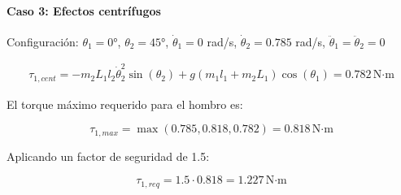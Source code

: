 \paragraph{Caso 3: Efectos centrífugos}

Configuración: $\theta_1 = 0°$, $\theta_2 = 45°$, $\dot{\theta}_1 = 0$ rad/s, $\dot{\theta}_2 = 0.785$ rad/s, $\ddot{\theta}_1 = \ddot{\theta}_2 = 0$

\begin{multline}
\tau_{1,cent} = - m_2L_1l_2\dot{\theta}_2^2\sin(\theta_2) + g(m_1l_1 + m_2L_1)\cos(\theta_1) = 0.782 \, \text{N·m}
\end{multline}

El torque máximo requerido para el hombro es:

\begin{equation}
\tau_{1,max} = \max(0.785, 0.818, 0.782) = 0.818 \, \text{N·m} 
\end{equation}

Aplicando un factor de seguridad de 1.5:

\begin{equation}
\tau_{1,req} = 1.5 \cdot 0.818 = 1.227 \, \text{N·m}
\end{equation}




